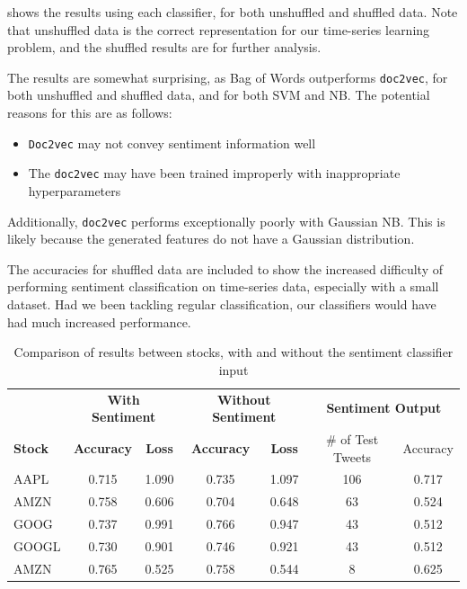 \documentclass[12pt,a4paper,twoside,openright]{report}
\begin{document}
 shows the results using each classifier, for both unshuffled and shuffled data.
Note that unshuffled data is the correct representation for our time-series learning problem,
and the shuffled results are for further analysis.

The results are somewhat surprising, as
Bag of Words outperforms \texttt{doc2vec}, for both unshuffled and shuffled data,
and for both SVM and NB.
The potential reasons for this are as follows:
\begin{itemize}
\item
\texttt{Doc2vec} may not convey sentiment information well

\item
The \texttt{doc2vec} may have been trained improperly with inappropriate hyperparameters
\end{itemize}

Additionally, \texttt{doc2vec} performs exceptionally poorly with Gaussian NB.
This is likely because the generated features do not have a Gaussian distribution.

The accuracies for shuffled data are included to show the increased difficulty of performing
sentiment classification on time-series data, especially with a small dataset. Had we been
tackling regular classification, our classifiers would have had much increased performance.

\begin{table}[H]
\centering
\begin{tabular}{lcccccc} 
\toprule
               & \multicolumn{2}{c}{\textbf{With Sentiment} }      & \multicolumn{2}{c}{\textbf{Without Sentiment}} 		& \multicolumn{2}{c}{\textbf{Sentiment Output}}\bigstrut\\
\textbf{Stock} & \textbf{Accuracy}                            & \textbf{Loss} & \textbf{Accuracy}                              & \textbf{Loss}  &\# of Test Tweets	& Accuracy	\bigstrut\\ \midrule
AAPL           & 0.715                                        & 1.090         &  0.735                                         & 1.097          &106	&0.717	\bigstrut\\
AMZN           & 0.758                                        & 0.606         &  0.704                                         & 0.648          &63		&0.524     \bigstrut\\
GOOG           & 0.737                                        & 0.991         &  0.766                                         & 0.947          &43		&0.512     \bigstrut\\
GOOGL          & 0.730                                        & 0.901         &  0.746                                         & 0.921          &43		&0.512	\bigstrut\\
AMZN           & 0.765                                        & 0.525         &  0.758                                         & 0.544          &8		&0.625	\bigstrut\\
\bottomrule
\end{tabular}
\caption{Comparison of results between stocks, with and without the sentiment classifier input}
\label{table:stockSentiResults}
\end{table}
\end{document}
